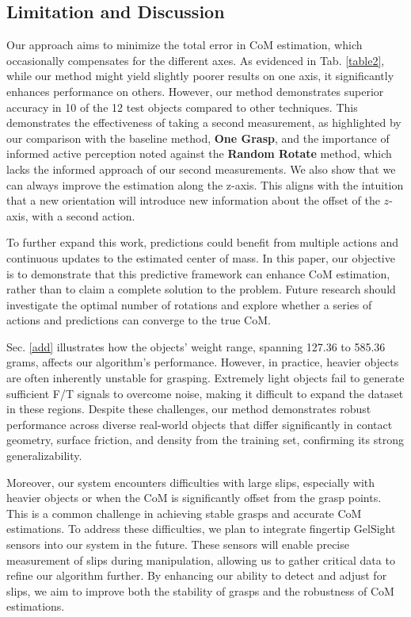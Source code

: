 \subsection{Limitation and Discussion}
\label{discuss}

Our approach aims to minimize the total error in CoM estimation, which occasionally compensates for the different axes. As evidenced in Tab. \ref{table2}, while our method might yield slightly poorer results on one axis, it significantly enhances performance on others. However, our method demonstrates superior accuracy in 10 of the 12 test objects compared to other techniques. This demonstrates the effectiveness of taking a second measurement, as highlighted by our comparison with the baseline method, \textbf{One Grasp}, and the importance of informed active perception noted against the \textbf{Random Rotate} method, which lacks the informed approach of our second measurements. We also show that we can always improve the estimation along the z-axis. This aligns with the intuition that a new orientation will introduce new information about the offset of the $z$-axis, with a second action. 

To further expand this work, predictions could benefit from multiple actions and continuous updates to the estimated center of mass. In this paper, our objective is to demonstrate that this predictive framework can enhance CoM estimation, rather than to claim a complete solution to the problem. Future research should investigate the optimal number of rotations and explore whether a series of actions and predictions can converge to the true CoM.

Sec. \ref{add} illustrates how the objects’ weight range, spanning 127.36 to 585.36 grams, affects our algorithm’s performance. However, in practice, heavier objects are often inherently unstable for grasping. Extremely light objects fail to generate sufficient F/T signals to overcome noise, making it difficult to expand the dataset in these regions. Despite these challenges, our method demonstrates robust performance across diverse real-world objects that differ significantly in contact geometry, surface friction, and density from the training set, confirming its strong generalizability.

Moreover, our system encounters difficulties with large slips, especially with heavier objects or when the CoM is significantly offset from the grasp points. This is a common challenge in achieving stable grasps and accurate CoM estimations. To address these difficulties, we plan to integrate fingertip GelSight sensors \cite{gelsight} into our system in the future. These sensors will enable precise measurement of slips during manipulation, allowing us to gather critical data to refine our algorithm further. By enhancing our ability to detect and adjust for slips, we aim to improve both the stability of grasps and the robustness of CoM estimations. 




